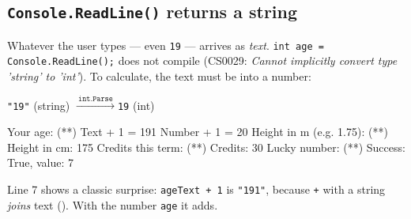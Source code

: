 \subsection{\texttt{Console.ReadLine()} returns a string}
Whatever the user types --- even \texttt{19} --- arrives as \emph{text}. \texttt{int age = Console.ReadLine();} does not compile (CS0029: \emph{Cannot implicitly convert type 'string' to 'int'}). To calculate, the text must be  into a number:
\begin{center}
\texttt{"19"} (string) \quad$\xrightarrow{\ \texttt{int.Parse}\ }$\quad \texttt{19} (int)
\end{center}

\begin{consolebox}
\begin{run}
Your age: (**)
Text   + 1 = 191
Number + 1 = 20
Height in m (e.g. 1.75): (**)
Height in cm: 175
Credits this term: (**)
Credits: 30
Lucky number: (**)
Success: True, value: 7
\end{run}
\end{consolebox}
Line 7 shows a classic surprise: \texttt{ageText + 1} is \texttt{"191"}, because \texttt{+} with a string \emph{joins} text (). With the number \texttt{age} it adds.

